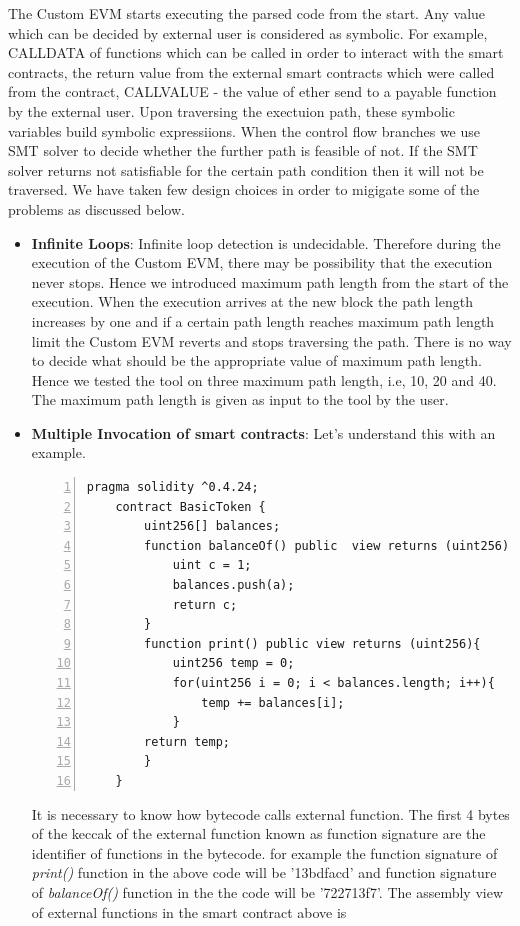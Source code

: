 \documentclass{article}
\begin{document}
The Custom EVM starts executing the parsed code from the start. Any value which can be decided by external user is considered as symbolic. For example, CALLDATA of functions which can be called in order to interact with the smart contracts, the return value from the external smart contracts which were called from the contract, CALLVALUE - the value of ether send to a payable function by the external user. Upon traversing the exectuion path, these symbolic variables build symbolic expressiions. When the control flow branches we use SMT solver to decide whether the further path is feasible of not. If the SMT solver returns not satisfiable for the certain path condition then it will not be traversed. We have taken few design choices in order to migigate some of the problems as discussed below. 
\begin{itemize}
    \item \textbf{Infinite Loops}: Infinite loop detection is undecidable. Therefore during the execution of the Custom EVM, there may be possibility that the execution never stops. Hence we introduced maximum path length from the start of the execution. When the execution arrives at the new block the path length increases by one and if a certain path length reaches maximum path length limit the Custom EVM reverts and stops traversing the path. There is no way to decide what should be the appropriate value of maximum path length. Hence we tested the tool on three maximum path length, i.e, 10, 20 and 40. The maximum path length is given as input to the tool by the user.
    \item \textbf{Multiple Invocation of smart contracts}: Let's understand this with an example.
    \begin{Verbatim}[numbers=left,xleftmargin=5mm]
    pragma solidity ^0.4.24;
    contract BasicToken {
        uint256[] balances;
        function balanceOf() public  view returns (uint256) {
            uint c = 1;
            balances.push(a);
            return c;
        }
        function print() public view returns (uint256){
            uint256 temp = 0;
            for(uint256 i = 0; i < balances.length; i++){
                temp += balances[i];
            }
        return temp;
        }
    }
    \end{Verbatim}
    It is necessary to know how bytecode calls external function. The first 4 bytes of the keccak of the external function known as function signature are the identifier of functions in the bytecode.
    for example the function signature of \emph{print()} function in the above code will be '13bdfacd' and function signature of \emph{balanceOf()} function in the the code will be '722713f7'. The assembly view of external functions in the smart contract above is

\end{itemize}
\end{document}
